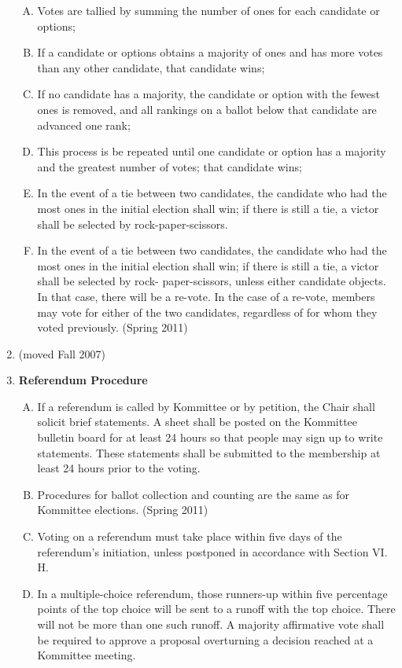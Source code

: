 \documentclass[12pt]{article}
\begin{document}
\begin{enumerate}[1.]
\begin{enumerate}[A.]
\item Votes are tallied by summing the number of ones for each candidate or options; 
\item If a candidate or options obtains a majority of ones and has more votes than any other candidate, that candidate wins; 
\item If no candidate has a majority, the candidate or option with the fewest ones is removed, and all rankings on a ballot below that candidate are advanced one rank; 
\item This process is be repeated until one candidate or option has a majority and the greatest number of votes; that candidate wins; 
\item In the event of a tie between two candidates, the candidate who had the most ones in the initial election shall win; if there is still a tie, a victor shall be selected by rock-paper-scissors. 
\item In the event of a tie between two candidates, the candidate who had the most ones in the initial election shall win; if there is still a tie, a victor shall be selected by rock- paper-scissors, unless either candidate objects. In that case, there will be a re-vote. In the case of a re-vote, members may vote for either of the two candidates, regardless of for whom they voted previously. (Spring 2011)
\end{enumerate}
\item (moved Fall 2007)
\item \textbf{Referendum Procedure}
\begin{enumerate}[A.]
\item If a referendum is called by Kommittee or by petition, the Chair shall solicit brief statements. A sheet shall be posted on the Kommittee bulletin board for at least 24 hours so that people may sign up to write statements. These statements shall be submitted to the membership at least 24 hours prior to the voting.
\item Procedures for ballot collection and counting are the same as for Kommittee elections. (Spring 2011) 
\item Voting on a referendum must take place within five days of the referendum's initiation, unless postponed in accordance with Section VI. H. 
\item In a multiple-choice referendum, those runners-up within five percentage points of the top choice will be sent to a runoff with the top choice. There will not be more than one such runoff. A majority affirmative vote shall be required to approve a proposal overturning a decision reached at a Kommittee meeting. 

\end{enumerate}
\end{enumerate}
\end{document}
